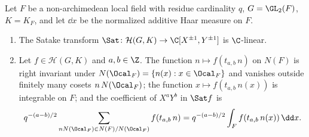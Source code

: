 Let $F$ be a non-archimedean local field with residue cardinality $q$, $G=\GL_2(F)$, $K=K_F$, and let $\dd x$ be the
normalized additive Haar measure on $F$.
\begin{enumerate}[label=(\alph*)]
\item The Satake transform $\Sat\colon\mathcal H(G,K)\to\C[X^{\pm1},Y^{\pm1}]$ is $\C$-linear.
\item Let $f\in\mathcal H(G,K)$ and $a,b\in\Z$. The function $n\mapsto f(t_{a,b}\,n)$ on $N(F)$ is right invariant under
  $N(\Ocal_F)=\{n(x):x\in\Ocal_F\}$ and vanishes outside finitely many cosets $n\,N(\Ocal_F)$; the function
  $x\mapsto f(t_{a,b}\,n(x))$ is integrable on $F$; and the coefficient of $X^aY^b$ in $\Sat f$ is
  \[
    q^{-(a-b)/2}\sum_{nN(\Ocal_F)\in N(F)/N(\Ocal_F)}f(t_{a,b}\,n)=q^{-(a-b)/2}\int_Ff(t_{a,b}\,n(x))\,\dd x .
  \]
\end{enumerate}
